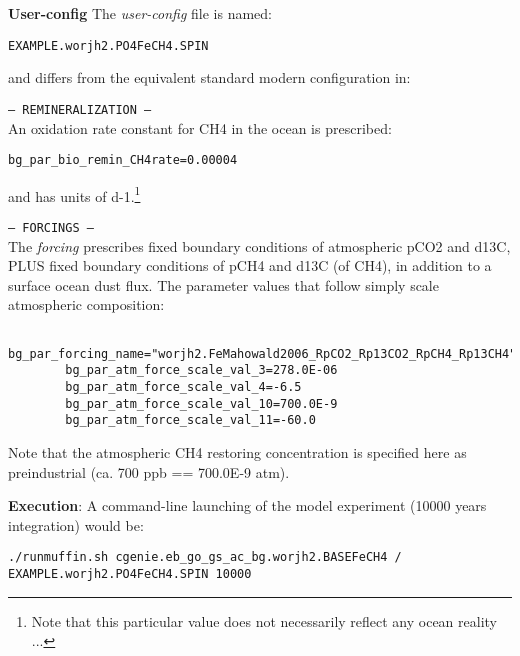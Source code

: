 \documentclass[10pt,twoside]{article}
\begin{document}
\noindent \textbf{User-config} The \textit{user-config} file is named:
\vspace{-10pt}\begin{verbatim}EXAMPLE.worjh2.PO4FeCH4.SPIN\end{verbatim}\vspace{-10pt}
and differs from the equivalent standard modern configuration in:
\begin{compactitem}
                
        \item \texttt{--- REMINERALIZATION ---}
        \\ An oxidation rate constant for CH4 in the ocean is prescribed:
        \vspace{-5pt}\begin{verbatim}bg_par_bio_remin_CH4rate=0.00004\end{verbatim}\vspace{-5pt}
        and has units of d-1.\footnote{Note that this particular value does not necessarily reflect any ocean reality ...}
        
        \item \texttt{--- FORCINGS ---}
        \\ The \textit{forcing} prescribes fixed boundary conditions of atmospheric pCO2 and d13C, PLUS fixed boundary conditions of pCH4 and d13C (of CH4), in addition to a surface ocean dust flux.
        The parameter values that follow simply scale atmospheric composition:
        \vspace{-5pt}\begin{verbatim}
        bg_par_forcing_name="worjh2.FeMahowald2006_RpCO2_Rp13CO2_RpCH4_Rp13CH4"
        bg_par_atm_force_scale_val_3=278.0E-06
        bg_par_atm_force_scale_val_4=-6.5
        bg_par_atm_force_scale_val_10=700.0E-9
        bg_par_atm_force_scale_val_11=-60.0
        \end{verbatim}\vspace{-5pt}
        Note that the atmospheric CH4 restoring concentration is specified here as preindustrial (ca. 700 ppb == 700.0E-9 atm).

\end{compactitem}

\noindent \textbf{Execution}: A command-line launching of the model experiment (10000 years integration) would be:
\vspace{-10pt}\begin{verbatim}./runmuffin.sh cgenie.eb_go_gs_ac_bg.worjh2.BASEFeCH4 /
EXAMPLE.worjh2.PO4FeCH4.SPIN 10000\end{verbatim}\vspace{-5pt}
\end{document}
